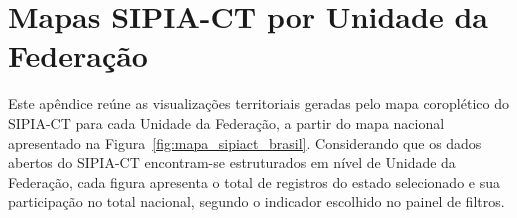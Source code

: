 \documentclass[11pt,a4paper]{article}
\begin{document}
\clearpage
\section{Mapas SIPIA-CT por Unidade da Federação}
\label{ap:sipiact_uf}

Este apêndice reúne as visualizações territoriais geradas pelo mapa coroplético do SIPIA-CT para cada Unidade da Federação, a partir do mapa nacional apresentado na Figura~\ref{fig:mapa_sipiact_brasil}. Considerando que os dados abertos do SIPIA-CT encontram-se estruturados em nível de Unidade da Federação, cada figura apresenta o total de registros do estado selecionado e sua participação no total nacional, segundo o indicador escolhido no painel de filtros.
\end{document}

